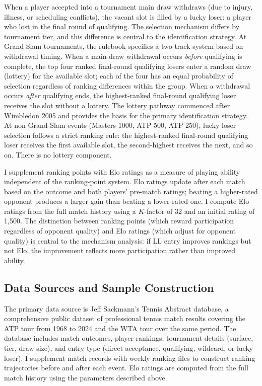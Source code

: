 When a player accepted into a tournament main draw withdraws (due to injury, illness, or scheduling conflicts), the vacant slot is filled by a lucky loser: a player who lost in the final round of qualifying. The selection mechanism differs by tournament tier, and this difference is central to the identification strategy. At Grand Slam tournaments, the rulebook specifies a two-track system based on withdrawal timing. When a main-draw withdrawal occurs \textit{before} qualifying is complete, the top four ranked final-round qualifying losers enter a random draw (lottery) for the available slot; each of the four has an equal probability of selection regardless of ranking differences within the group. When a withdrawal occurs \textit{after} qualifying ends, the highest-ranked final-round qualifying loser receives the slot without a lottery. The lottery pathway commenced after Wimbledon 2005 and provides the basis for the primary identification strategy. At non-Grand-Slam events (Masters 1000, ATP 500, ATP 250), lucky loser selection follows a strict ranking rule: the highest-ranked final-round qualifying loser receives the first available slot, the second-highest receives the next, and so on. There is no lottery component.

I supplement ranking points with Elo ratings as a measure of playing ability independent of the ranking-point system. Elo ratings update after each match based on the outcome and both players' pre-match ratings; beating a higher-rated opponent produces a larger gain than beating a lower-rated one. I compute Elo ratings from the full match history using a $K$-factor of 32 and an initial rating of 1,500. The distinction between ranking points (which reward participation regardless of opponent quality) and Elo ratings (which adjust for opponent quality) is central to the mechanism analysis: if LL entry improves rankings but not Elo, the improvement reflects more participation rather than improved ability.

\subsection{Data Sources and Sample Construction}
\label{sec:data_sources}

The primary data source is Jeff Sackmann's Tennis Abstract database, a comprehensive public dataset of professional tennis match results covering the ATP tour from 1968 to 2024 and the WTA tour over the same period. The database includes match outcomes, player rankings, tournament details (surface, tier, draw size), and entry type (direct acceptance, qualifying, wildcard, or lucky loser). I supplement match records with weekly ranking files to construct ranking trajectories before and after each event. Elo ratings are computed from the full match history using the parameters described above.

